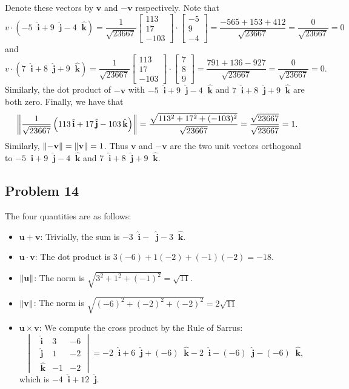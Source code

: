 \documentclass[11pt]{article}
\renewcommand{\vec}[1]{\mathbf{#1}}
\newcommand{\uvec}[1]{\mathop{} \!\hat{\mathbf{#1}}}
\begin{document}
Denote these vectors by $\vec{v}$ and $-\vec{v}$ respectively. Note that 
\[
	v \cdot (-5 \uvec{i} + 9 \uvec{j} -4 \uvec{k}) = \frac{1}{\sqrt{23667}} \begin{bmatrix} 113 \\ 17 \\ -103 \end{bmatrix} \cdot \begin{bmatrix} -5 \\ 9 \\ -4 \end{bmatrix} = \frac{-565 + 153 + 412}{\sqrt{23667}} = \frac{0}{\sqrt{23667}} = 0
\]
and
\[	
	v \cdot (7 \uvec{i} + 8 \uvec{j} + 9 \uvec{k}) = \frac{1}{\sqrt{23667}} \begin{bmatrix} 113 \\ 17 \\ -103 \end{bmatrix} \cdot \begin{bmatrix} 7 \\ 8 \\ 9 \end{bmatrix} = \frac{791 + 136 - 927}{\sqrt{23667}} = \frac{0}{\sqrt{23667}} = 0.
\]
Similarly, the dot product of $-\vec{v}$ with $-5 \uvec{i} + 9 \uvec{j} - 4 \uvec{k}$ and $7 \uvec{i} + 8 \uvec{j} + 9 \uvec{k}$ are both zero. Finally, we have that 
\[
	\norm{\frac{1}{\sqrt{23667}} \left( 113 \uvec{i} + 17 \uvec{j} - 103 \uvec{k} \right)} = \frac{\sqrt{113^{2} + 17^{2} + (-103)^2}}{\sqrt{23667}} = \frac{\sqrt{23667}}{\sqrt{23667}} = 1.
\]
Similarly, $\norm{-\vec{v}} = \norm{\vec{v}} = 1$. Thus $\vec{v}$ and $- \vec{v}$ are the two unit vectors orthogonal to $-5 \uvec{i} + 9 \uvec{j} - 4 \uvec{k}$ and $7 \uvec{i} + 8 \uvec{j} + 9 \uvec{k}$. 

\subsection*{Problem 14}

The four quantities are as follows:
\begin{itemize}
	\item $\vec{u} + \vec{v}$: Trivially, the sum is $-3 \uvec{i} - \uvec{j} - 3 \uvec{k}$.
	\item $\vec{u} \cdot \vec{v}$: The dot product is $3(-6) + 1(-2) + (-1)(-2) = -18$.
	\item $\norm{\vec{u}}$: The norm is $\sqrt{3^2 + 1^2 + (-1)^2} = \sqrt{11}$.
	\item $\norm{\vec{v}}$: The norm is $\sqrt{(-6)^2 + (-2)^2 + (-2)^2} = 2\sqrt{11}$
	\item $\vec{u} \times \vec{v}$: We compute the cross product by the Rule of Sarrus:
	\[
		\begin{vmatrix} \uvec{i} & 3 & -6\\ \uvec{j} & 1 & -2 \\ \uvec{k} & -1 & -2 \end{vmatrix} = -2 \uvec{i} + 6 \uvec{j} + (-6) \uvec{k} - 2 \uvec{i} - (-6) \uvec{j} - (-6) \uvec{k}, 
	\]
	which is $-4 \uvec{i} + 12 \uvec{j}$.
\end{itemize}
\end{document}
